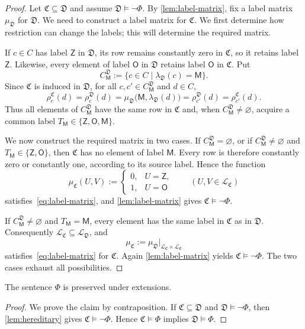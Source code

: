 \documentclass{lmcs}
\newcommand{\C}{\mathfrak{C}}
\newcommand{\D}{\mathfrak{D}}
\newcommand{\Zt}{\mathsf{Z}}
\newcommand{\Ot}{\mathsf{O}}
\newcommand{\Mt}{\mathsf{M}}
\newcommand{\Types}{\{\Zt,\Ot,\Mt\}}
\begin{document}
\begin{proof}
Let \(\C\subseteq\D\) and assume \(\D\models\neg\Phi\).  By
\cref{lem:label-matrix}, fix a label matrix \(\mu_{\D}\) for \(\D\).  We
need to construct a label matrix for \(\C\).  We first determine how
restriction can change the labels; this will determine the required matrix.

If \(c\in C\) has label \(\Zt\) in \(\D\), its row remains constantly
zero in \(\C\), so it retains label \(\Zt\).  Likewise, every element of
label \(\Ot\) in \(\D\) retains label \(\Ot\) in \(\C\).  Put
\[
  C_{\Mt}^{\D}:=\{c\in C\mid \lambda_{\D}(c)=\Mt\}.
\]
Since \(\C\) is induced in \(\D\), for all
\(c,c'\in C_{\Mt}^{\D}\) and \(d\in C\),
\[
  \rho_c^{\C}(d)
  =\rho_c^{\D}(d)
  =\mu_{\D}\bigl(\Mt,\lambda_{\D}(d)\bigr)
  =\rho_{c'}^{\D}(d)
  =\rho_{c'}^{\C}(d).
\]
Thus all elements of \(C_{\Mt}^{\D}\) have the same row in \(\C\) and, when
\(C_{\Mt}^{\D}\neq\varnothing\), acquire a common label
\(T_{\Mt}\in\Types\).

We now construct the required matrix in two cases.  If
\(C_{\Mt}^{\D}=\varnothing\), or if
\(C_{\Mt}^{\D}\neq\varnothing\) and
\(T_{\Mt}\in\{\Zt,\Ot\}\), then \(\C\) has no element of
label \(\Mt\).  Every row is therefore constantly zero or constantly one,
according to its source label.  Hence the function
\[
  \mu_{\C}(U,V):=
  \begin{cases}
    0,&U=\Zt,\\
    1,&U=\Ot
  \end{cases}
  \qquad(U,V\in\mathcal L_{\C})
\]
satisfies~\eqref{eq:label-matrix}, and
\cref{lem:label-matrix} gives \(\C\models\neg\Phi\).

If \(C_{\Mt}^{\D}\neq\varnothing\) and \(T_{\Mt}=\Mt\), every element has
the same label in \(\C\) as in \(\D\).  Consequently
\(\mathcal L_{\C}\subseteq\mathcal L_{\D}\), and
\[
  \mu_{\C}:=
  \mu_{\D}|_{\mathcal L_{\C}\times\mathcal L_{\C}}
\]
satisfies~\eqref{eq:label-matrix} for \(\C\).  Again
\cref{lem:label-matrix} yields \(\C\models\neg\Phi\).  The two cases exhaust
all possibilities.
\end{proof}

\begin{thm}
\label{thm:extension-preserved}
The sentence \(\Phi\) is preserved under extensions.
\end{thm}

\begin{proof}
We prove the claim by contraposition.  If \(\C\subseteq\D\) and
\(\D\models\neg\Phi\), then \cref{lem:hereditary} gives
\(\C\models\neg\Phi\).  Hence \(\C\models\Phi\) implies
\(\D\models\Phi\).
\end{proof}
\end{document}

